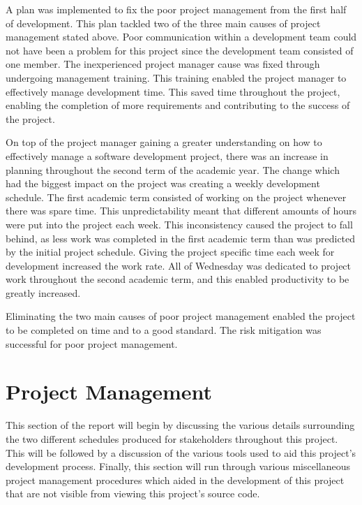 \documentclass{article}
\begin{document}
A plan was implemented to fix the poor project management from the first half of development. This plan tackled two of the three main causes of project management stated above. Poor communication within a development team could not have been a problem for this project since the development team consisted of one member. The inexperienced project manager cause was fixed through undergoing management training. This training enabled the project manager to effectively manage development time. This saved time throughout the project, enabling the completion of more requirements and contributing to the success of the project. \par

On top of the project manager gaining a greater understanding on how to effectively manage a software development project, there was an increase in planning throughout the second term of the academic year. The change which had the biggest impact on the project was creating a weekly development schedule. The first academic term consisted of working on the project whenever there was spare time. This unpredictability meant that different amounts of hours were put into the project each week. This inconsistency caused the project to fall behind, as less work was completed in the first academic term than was predicted by the initial project schedule. Giving the project specific time each week for development increased the work rate. All of Wednesday was dedicated to project work throughout the second academic term, and this enabled productivity to be greatly increased. \par

Eliminating the two main causes of poor project management enabled the project to be completed on time and to a good standard. The risk mitigation was successful for poor project management. \par

\section{Project Management}
\label{section:projectManagement}

This section of the report will begin by discussing the various details surrounding the two different schedules produced for stakeholders throughout this project. This will be followed by a discussion of the various tools used to aid this project's development process. Finally, this section will run through various miscellaneous project management procedures which aided in the development of this project that are not visible from viewing this project's source code. \par
\end{document}
